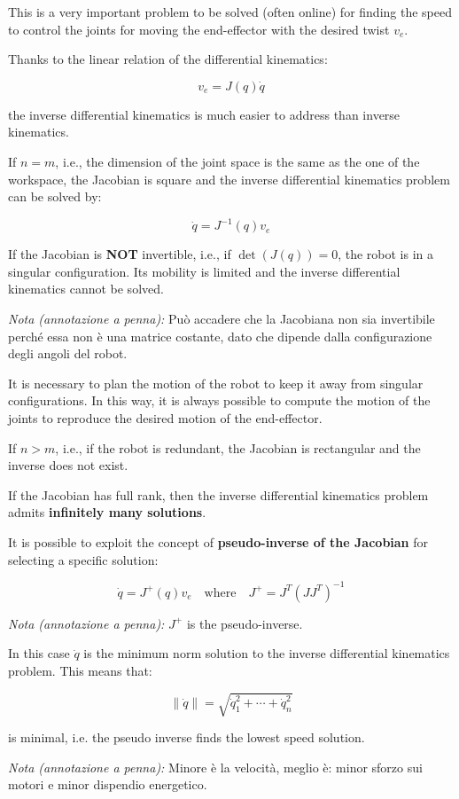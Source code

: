 This is a very important problem to be solved (often online) for finding the speed to control the joints for moving the end-effector with the desired twist $v_e$.

Thanks to the linear relation of the differential kinematics:

\[
    v_e = J(q) \dot{q}
\]

the inverse differential kinematics is much easier to address than inverse kinematics.

If $n = m$, i.e., the dimension of the joint space is the same as the one of the workspace, the Jacobian is square and the inverse differential kinematics problem can be solved by:

\[
    \dot{q} = J^{-1}(q) v_e
\]

If the Jacobian is \textbf{NOT} invertible, i.e., if $\det(J(q)) = 0$, the robot is in a singular configuration. Its mobility is limited and the inverse differential kinematics cannot be solved.

\textit{Nota (annotazione a penna):} Può accadere che la Jacobiana non sia invertibile perché essa non è una matrice costante, dato che dipende dalla configurazione degli angoli del robot.

It is necessary to plan the motion of the robot to keep it away from singular configurations. In this way, it is always possible to compute the motion of the joints to reproduce the desired motion of the end-effector.

If $n > m$, i.e., if the robot is redundant, the Jacobian is rectangular and the inverse does not exist.

If the Jacobian has full rank, then the inverse differential kinematics problem admits \textbf{infinitely many solutions}.

It is possible to exploit the concept of \textbf{pseudo-inverse of the Jacobian} for selecting a specific solution:

\[
\dot{q} = J^{+}(q) v_e
\quad\text{where}\quad
J^{+} = J^T (J J^T)^{-1}
\]

\textit{Nota (annotazione a penna):} $J^{+}$ is the pseudo-inverse.

In this case $\dot{q}$ is the minimum norm solution to the inverse differential kinematics problem. This means that:

\[
\|\dot{q}\| = \sqrt{\dot{q}_1^2 + \cdots + \dot{q}_n^2}
\]

is minimal, i.e. the pseudo inverse finds the lowest speed solution.

\textit{Nota (annotazione a penna):} Minore è la velocità, meglio è: minor sforzo sui motori e minor dispendio energetico.

